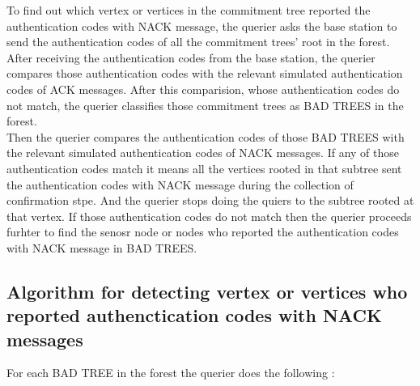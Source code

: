 To find out which vertex or vertices in the commitment tree reported the authentication codes with NACK message, the querier asks the base station to send the authentication codes of all the commitment trees' root in the forest. After receiving the authentication codes from the base station, the querier compares those authentication codes with the relevant simulated authentication codes of ACK messages. After this comparision, whose authentication codes do not match, the querier classifies those commitment trees as BAD TREES in the forest. \\


Then the querier compares the authentication codes of those BAD TREES with the relevant simulated authentication codes of NACK messages. If any of those authentication codes match it means all the vertices rooted in that subtree sent the authentication codes with NACK message during the collection of confirmation stpe. And the querier stops doing the quiers to the subtree rooted at that vertex. If those authentication codes do not match then the querier proceeds furhter to find the senosr node or nodes who reported the authentication codes with NACK message in BAD TREES.\\


\subsection{Algorithm for detecting vertex or vertices who reported authenctication codes with NACK messages }

For each BAD TREE in the forest the querier does the following :

